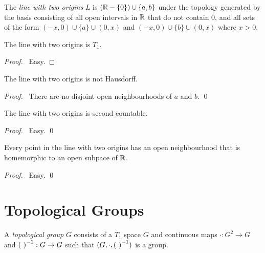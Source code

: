 \begin{definition}
    The \emph{line with two origins} $L$ is $(\mathbb{R} - \{0\}) \cup \{a,b\}$ under the topology
    generated by the basis consisting of all open intervals in $\mathbb{R}$ that do not contain $0$,
    and all sets of the form $(-x,0) \cup \{ a \} \cup (0,x)$ and $(-x,0) \cup \{b\} \cup (0,x)$
    where $x > 0$.
\end{definition}

\begin{proposition}
    The line with two origins is $T_1$.
\end{proposition}

\begin{proof}
    \pf\ Easy.
\end{proof}

\begin{proposition}
    The line with two origins is not Hausdorff.
\end{proposition}

\begin{proof}
    \pf\ There are no disjoint open neighbourhoods of $a$ and $b$. \qed
\end{proof}

\begin{proposition}
    The line with two origins is second countable.
\end{proposition}

\begin{proof}
    \pf\ Easy. \qed
\end{proof}

\begin{proposition}
    Every point in the line with two origins has an open neighbourhood that is homemorphic to an open subpace of $\mathbb{R}$.
\end{proposition}

\begin{proof}
    \pf\ Easy. \qed
\end{proof}

\chapter{Topological Groups}

\begin{definition}
    A \emph{topological group} $G$ consists of a $T_1$ space $G$ and continuous maps
    $\cdot : G^2 \rightarrow G$ and ${(\ )}^{-1} : G \rightarrow G$ such that $(G, \cdot, {(\ )}^{-1})$
    is a group.
\end{definition}

